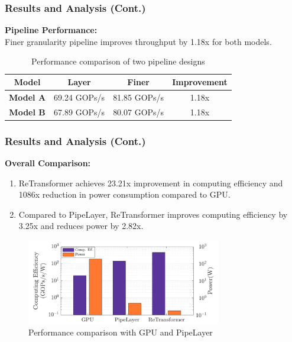 \documentclass[
	12pt, %
]{beamer}
\begin{document}
\begin{frame}
	\frametitle{Results and Analysis (Cont.)}
	\textbf{Pipeline Performance:}\\
	Finer granularity pipeline improves throughput by 1.18x for both models.
	
	\begin{table}[h]
		\centering
		\begin{tabular}{c|c|c|c}
			\hline
			\textbf{Model} & \textbf{Layer} & \textbf{Finer} & \textbf{Improvement} \\
			\hline
			\textbf{Model A} & 69.24 GOPs/s & 81.85 GOPs/s & 1.18x \\ \hline
			\textbf{Model B}& 67.89 GOPs/s & 80.07 GOPs/s & 1.18x \\
			\hline
		\end{tabular}
		\caption{Performance comparison of two pipeline designs}
	\end{table}
\end{frame}



\begin{frame}
	\frametitle{Results and Analysis (Cont.)}
	\textbf{Overall Comparison:}\\
	
	\begin{enumerate}
		\item ReTransformer achieves 23.21x improvement in computing efficiency and 1086x reduction in power consumption compared to GPU.
		
		\item Compared to PipeLayer, ReTransformer improves computing efficiency by 3.25x and reduces power by 2.82x.
		
		
	\end{enumerate}
	
	\begin{figure}
		\includegraphics[width=8.5cm]{Images/img8.png}
		\caption{Performance comparison with GPU and PipeLayer}
	\end{figure}
\end{frame}
\end{document}
